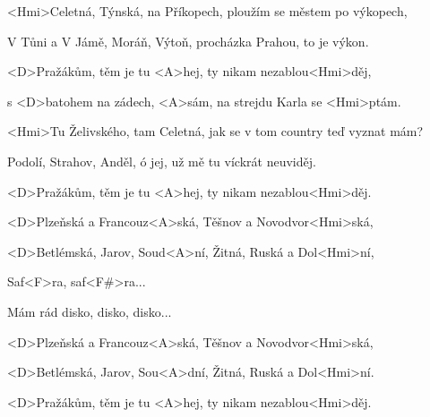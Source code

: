 

\zs
<Hmi>Celetná, Týnská, na Příkopech,
ploužím se městem po výkopech,

V Tůni a V Jámě, Moráň, Výtoň,
procházka Prahou, to je výkon.
\ks

\zr
<D>Pražákům, těm je tu <A>hej,
ty nikam nezablou<Hmi>děj,

s <D>batohem na zádech, <A>sám,
na strejdu Karla se <Hmi>ptám.
\kr

\zs
<Hmi>Tu Želivského, tam Celetná,
jak se v tom country teď vyznat mám?

Podolí, Strahov, Anděl, ó jej,
už mě tu víckrát neuviděj.
\ks

\zr
<D>Pražákům, těm je tu <A>hej,
ty nikam nezablou<Hmi>děj.

<D>Plzeňská a Francouz<A>ská,
Těšnov a Novodvor<Hmi>ská,

<D>Betlémská, Jarov, Soud<A>ní,
Žitná, Ruská a Dol<Hmi>ní,

Saf<F>ra, saf<F#>ra...

Mám rád disko, disko, disko...
\kr

\zr
<D>Plzeňská a Francouz<A>ská,
Těšnov a Novodvor<Hmi>ská,

<D>Betlémská, Jarov, Sou<A>dní,
Žitná, Ruská a Dol<Hmi>ní.
\kr

\zr
<D>Pražákům, těm je tu <A>hej,
ty nikam nezablou<Hmi>děj.
\kr
\kp
